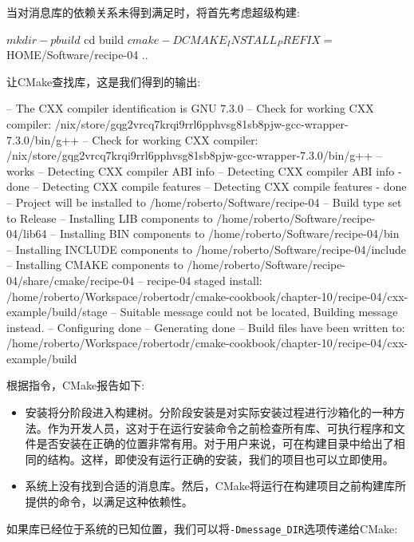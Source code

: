 当对消息库的依赖关系未得到满足时，将首先考虑超级构建:

\begin{codebox}[shell]
$ mkdir -p build
$ cd build
$ cmake -DCMAKE_INSTALL_PREFIX=$HOME/Software/recipe-04 ..
\end{codebox}

让CMake查找库，这是我们得到的输出:

\begin{codebox}[shell]
-- The CXX compiler identification is GNU 7.3.0
-- Check for working CXX compiler: /nix/store/gqg2vrcq7krqi9rrl6pphvsg81sb8pjw-gcc-wrapper-7.3.0/bin/g++
-- Check for working CXX compiler: /nix/store/gqg2vrcq7krqi9rrl6pphvsg81sb8pjw-gcc-wrapper-7.3.0/bin/g++ -- works
-- Detecting CXX compiler ABI info
-- Detecting CXX compiler ABI info - done
-- Detecting CXX compile features
-- Detecting CXX compile features - done
-- Project will be installed to /home/roberto/Software/recipe-04
-- Build type set to Release
-- Installing LIB components to /home/roberto/Software/recipe-04/lib64
-- Installing BIN components to /home/roberto/Software/recipe-04/bin
-- Installing INCLUDE components to /home/roberto/Software/recipe-04/include
-- Installing CMAKE components to /home/roberto/Software/recipe-04/share/cmake/recipe-04
-- recipe-04 staged install: /home/roberto/Workspace/robertodr/cmake-cookbook/chapter-10/recipe-04/cxx-example/build/stage
-- Suitable message could not be located, Building message instead.
-- Configuring done
-- Generating done
-- Build files have been written to: /home/roberto/Workspace/robertodr/cmake-cookbook/chapter-10/recipe-04/cxx-example/build
\end{codebox}

根据指令，CMake报告如下:

\begin{itemize}
\item 安装将分阶段进入构建树。分阶段安装是对实际安装过程进行沙箱化的一种方法。作为开发人员，这对于在运行安装命令之前检查所有库、可执行程序和文件是否安装在正确的位置非常有用。对于用户来说，可在构建目录中给出了相同的结构。这样，即使没有运行正确的安装，我们的项目也可以立即使用。

\item 系统上没有找到合适的消息库。然后，CMake将运行在构建项目之前构建库所提供的命令，以满足这种依赖性。

\end{itemize}

如果库已经位于系统的已知位置，我们可以将\texttt{-Dmessage\_DIR}选项传递给CMake:

